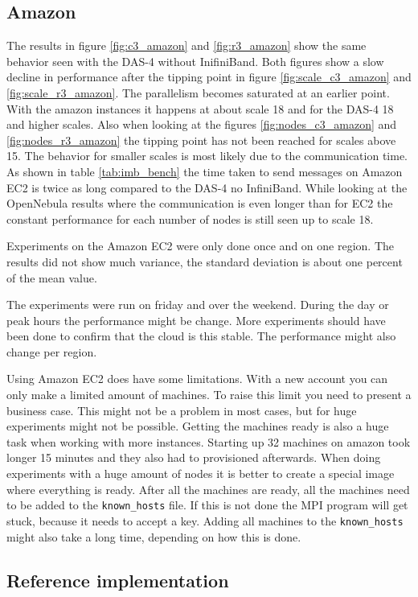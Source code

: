 \subsection{Amazon}
The results in figure \ref{fig:c3_amazon} and \ref{fig:r3_amazon} show the same behavior seen  with the DAS-4 without InifiniBand. Both figures show a slow decline in performance after the tipping point in figure \ref{fig:scale_c3_amazon} and \ref{fig:scale_r3_amazon}. The parallelism becomes saturated at an earlier point. With the amazon instances it happens at about scale 18 and for the DAS-4 18 and higher scales. Also when looking at the figures \ref{fig:nodes_c3_amazon} and \ref{fig:nodes_r3_amazon} the tipping point has not been reached for scales above 15. The behavior for smaller scales is most likely due to the communication time. As shown in table \ref{tab:imb_bench} the time taken to send messages on Amazon EC2 is twice as long compared to the DAS-4 no InfiniBand. While looking at the OpenNebula results where the communication is even longer than for EC2 the constant performance for each number of nodes is still seen up to scale 18.

Experiments on the Amazon EC2 were only done once and on one region. The results did not show much variance, the standard deviation is about one percent of the mean value.

The experiments were run on friday and over the weekend. During the day or peak hours the performance might be change. More experiments should have been done to confirm that the cloud is this stable. The performance might also change per region. 


Using Amazon EC2 does have some limitations. With a new account you can only make a limited amount of machines. To raise this limit you need to present a business case. This might not be a problem in most cases, but for huge experiments might not be possible. Getting the machines ready is also a huge task when working with more instances. Starting up 32 machines on amazon took longer 15 minutes and they also had to provisioned afterwards. When doing experiments with a huge amount of nodes it is better to create a special image where everything is ready. After all the machines are ready, all the machines need to be added to the \texttt{known\_hosts} file. If this is not done the MPI program will get stuck, because it needs to accept a key. Adding all machines to the \texttt{known\_hosts} might also take a long time, depending on how this is done.


\subsection{Reference implementation}


